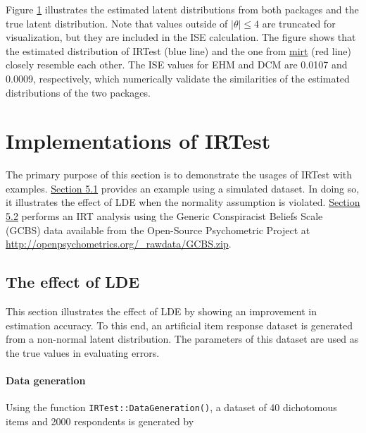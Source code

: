 Figure \protect\hyperlink{fig:LDE-validation-latex}{1} illustrates the estimated latent
distributions from both packages and the true latent distribution. Note
that values outside of \(\left|\theta\right|\le4\) are truncated for
visualization, but they are included in the ISE calculation. The figure
shows that the estimated distribution of IRTest ({blue
line}) and the one from
\href{https://CRAN.R-project.org/package=mirt}{mirt} ({red
line}) closely resemble each other. The ISE
values for EHM and DCM are 0.0107 and 0.0009, respectively, which
numerically validate the similarities of the estimated distributions of
the two packages.

\hypertarget{implementations-of-the-irtest}{%
\section{Implementations of IRTest}\label{implementations-of-the-irtest}}

The primary purpose of this section is to demonstrate the usages of
IRTest with examples. \protect\hyperlink{the-effect-of-the-lde}{Section 5.1} provides an
example using a simulated dataset. In doing so, it illustrates the
effect of LDE when the normality assumption is violated. \protect\hyperlink{an-empirical-example}{Section
5.2} performs an IRT analysis using the Generic
Conspiracist Beliefs Scale (GCBS) data \citep{GCBS} available from the
Open-Source Psychometric Project at
\url{http://openpsychometrics.org/_rawdata/GCBS.zip}.

\hypertarget{the-effect-of-the-lde}{%
\subsection{The effect of LDE}\label{the-effect-of-the-lde}}

This section illustrates the effect of LDE by showing an improvement in
estimation accuracy. To this end, an artificial item response dataset is
generated from a non-normal latent distribution. The parameters of this
dataset are used as the true values in evaluating errors.

\hypertarget{data-generation}{%
\paragraph{Data generation}\label{data-generation}}

Using the function \texttt{IRTest::DataGeneration()}, a dataset of 40
dichotomous items and 2000 respondents is generated by

